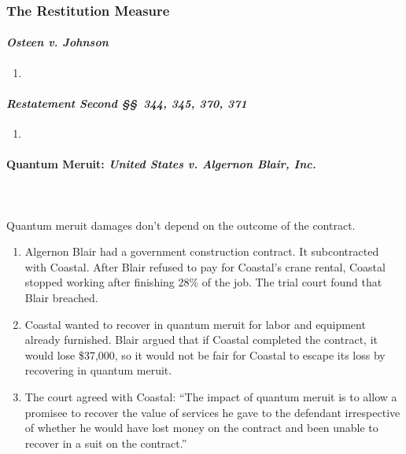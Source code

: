 \subsubsection{The Restitution Measure}

\paragraph{\emph{Osteen v. Johnson}}

\begin{enumerate}
    \item %
\end{enumerate}

\paragraph{\emph{Restatement Second \S\S\ 344, 345, 370, 371}}

\begin{enumerate}
    \item %
\end{enumerate}

\paragraph{Quantum Meruit: \emph{United States v. Algernon Blair, Inc.}}
~\\\\
Quantum meruit damages don't depend on the outcome of the contract.

\begin{enumerate}
    \item Algernon Blair had a government construction contract. It subcontracted 
    with Coastal. After Blair refused to pay for Coastal's crane rental, 
    Coastal stopped working after finishing 28\% of the job. The trial court 
    found that Blair breached.
    \item Coastal wanted to recover in quantum meruit for labor and equipment 
    already furnished. Blair argued that if Coastal completed the contract, it 
    would lose \$37,000, so it would not be fair for Coastal to escape its 
    loss by recovering in quantum meruit.
    \item The court agreed with Coastal: ``The impact of quantum meruit is to 
    allow a promisee to recover the value of services he gave to the defendant 
    irrespective of whether he would have lost money on the contract and been 
    unable to recover in a suit on the contract.''
\end{enumerate}

